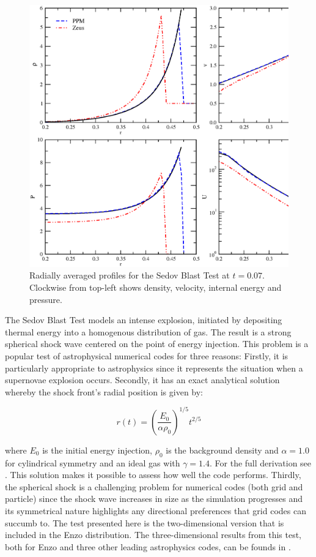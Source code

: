 \begin{figure}
\begin{center}
\includegraphics[width=\textwidth]{figures/sedov-profiles.eps}
\caption{Radially averaged profiles for the Sedov Blast Test at $t =
0.07$. Clockwise from top-left shows density, velocity, internal
energy and pressure.}
\label{fig.sedov2}
\end{center}
\end{figure}

The Sedov Blast Test \citep{Sedov1959} models an intense explosion,
initiated by depositing thermal energy into a homogenous distribution
of gas. The result is a strong spherical shock wave centered on the
point of energy injection.  This problem is a popular test of
astrophysical numerical codes for three reasons: Firstly, it is
particularly appropriate to astrophysics since it represents the
situation when a supernovae explosion occurs. Secondly, it has an
exact analytical solution whereby the shock front's radial position is
given by:

\begin{equation} r(t) =
\left(\frac{E_0}{\alpha\rho_0}\right)^{1/5}t^{2/5}
\end{equation}

\noindent where $E_0$ is the initial energy injection, $\rho_0$ is the
background density and $\alpha = 1.0$ for cylindrical symmetry and an
ideal gas with $\gamma = 1.4$. For the full derivation see
\citet{Sedov1959}. This solution makes it possible to assess how well
the code performs. Thirdly, the spherical shock is a challenging
problem for numerical codes (both grid and particle) since the shock
wave increases in size as the simulation progresses and its
symmetrical nature highlights any directional preferences that grid
codes can succumb to. The test presented here is the two-dimensional
version that is included in the Enzo distribution. The
three-dimensional results from this test, both for Enzo and three
other leading astrophysics codes, can be founds in \citet{Tasker2008}.

